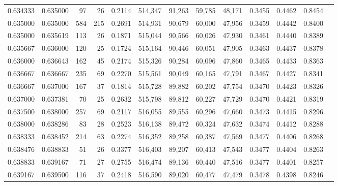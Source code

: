 \begin{tabular}{rrrrrrrrrrrrr}
0.634333 & 0.635000 &    97 &  26 &                                     0.2114 & 514,347 &  91,263 &  59,785 &  48,171 & 0.3455 & 0.4462 & 0.8454 \\
0.635000 & 0.635000 &   584 & 215 &                                     0.2691 & 514,931 &  90,679 &  60,000 &  47,956 & 0.3459 & 0.4442 & 0.8400 \\
0.635000 & 0.635619 &   113 &  26 &                                     0.1871 & 515,044 &  90,566 &  60,026 &  47,930 & 0.3461 & 0.4440 & 0.8389 \\
0.635667 & 0.636000 &   120 &  25 &                                     0.1724 & 515,164 &  90,446 &  60,051 &  47,905 & 0.3463 & 0.4437 & 0.8378 \\
0.636000 & 0.636643 &   162 &  45 &                                     0.2174 & 515,326 &  90,284 &  60,096 &  47,860 & 0.3465 & 0.4433 & 0.8363 \\
0.636667 & 0.636667 &   235 &  69 &                                     0.2270 & 515,561 &  90,049 &  60,165 &  47,791 & 0.3467 & 0.4427 & 0.8341 \\
0.636667 & 0.637000 &   167 &  37 &                                     0.1814 & 515,728 &  89,882 &  60,202 &  47,754 & 0.3470 & 0.4423 & 0.8326 \\
0.637000 & 0.637381 &    70 &  25 &                                     0.2632 & 515,798 &  89,812 &  60,227 &  47,729 & 0.3470 & 0.4421 & 0.8319 \\
0.637500 & 0.638000 &   257 &  69 &                                     0.2117 & 516,055 &  89,555 &  60,296 &  47,660 & 0.3473 & 0.4415 & 0.8296 \\
0.638000 & 0.638286 &    83 &  28 &                                     0.2523 & 516,138 &  89,472 &  60,324 &  47,632 & 0.3474 & 0.4412 & 0.8288 \\
0.638333 & 0.638452 &   214 &  63 &                                     0.2274 & 516,352 &  89,258 &  60,387 &  47,569 & 0.3477 & 0.4406 & 0.8268 \\
0.638476 & 0.638833 &    51 &  26 &                                     0.3377 & 516,403 &  89,207 &  60,413 &  47,543 & 0.3477 & 0.4404 & 0.8263 \\
0.638833 & 0.639167 &    71 &  27 &                                     0.2755 & 516,474 &  89,136 &  60,440 &  47,516 & 0.3477 & 0.4401 & 0.8257 \\
0.639167 & 0.639500 &   116 &  37 &                                     0.2418 & 516,590 &  89,020 &  60,477 &  47,479 & 0.3478 & 0.4398 & 0.8246 \\

\end{tabular}
